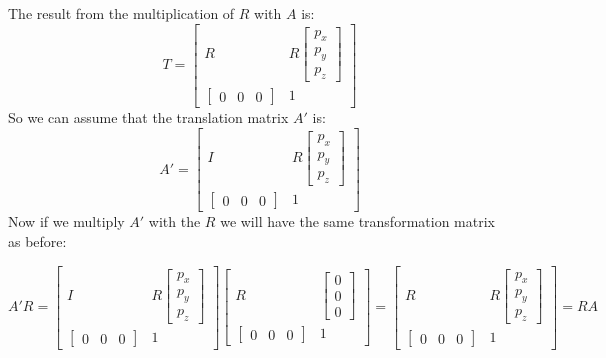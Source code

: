 The result from the multiplication of \(R\) with \(A\) is:
\[
T = 
\begin{bmatrix}
R &  R\begin{bmatrix} p_x\\p_y\\p_z \end{bmatrix}\\
\begin{bmatrix}
0 & 0 & 0
\end{bmatrix} & 1
\end{bmatrix}
\]
So we can assume that the translation matrix \(A'\) is:
\[
A' = 
\begin{bmatrix}
I &  R\begin{bmatrix} p_x\\p_y\\p_z \end{bmatrix}\\
\begin{bmatrix}
0 & 0 & 0
\end{bmatrix} & 1
\end{bmatrix}
\]
Now if we multiply \(A'\) with the \(R\) we will have the same transformation matrix as before:
 
\[
A'R = 
\begin{bmatrix}
I &  R\begin{bmatrix} p_x\\p_y\\p_z \end{bmatrix}\\
\begin{bmatrix}
0 & 0 & 0
\end{bmatrix} & 1
\end{bmatrix}
\begin{bmatrix}
R &  \begin{bmatrix} 0\\0\\0 \end{bmatrix}\\
\begin{bmatrix}
0 & 0 & 0
\end{bmatrix} & 1
\end{bmatrix}
= 
\begin{bmatrix}
R &  R\begin{bmatrix} p_x\\p_y\\p_z \end{bmatrix}\\
\begin{bmatrix}
0 & 0 & 0
\end{bmatrix} & 1
\end{bmatrix} =
RA
\]

